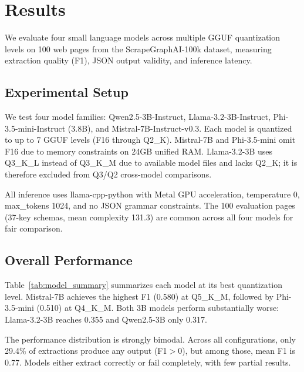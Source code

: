 
\section{Results}
\label{sec:results}

We evaluate four small language models across multiple GGUF quantization levels on 100 web pages from the ScrapeGraphAI-100k dataset, measuring extraction quality (F1), JSON output validity, and inference latency.

\subsection{Experimental Setup}

We test four model families: Qwen2.5-3B-Instruct, Llama-3.2-3B-Instruct, Phi-3.5-mini-Instruct (3.8B), and Mistral-7B-Instruct-v0.3. Each model is quantized to up to 7 GGUF levels (F16 through Q2\_K). Mistral-7B and Phi-3.5-mini omit F16 due to memory constraints on 24GB unified RAM. Llama-3.2-3B uses Q3\_K\_L instead of Q3\_K\_M due to available model files and lacks Q2\_K; it is therefore excluded from Q3/Q2 cross-model comparisons.

All inference uses llama-cpp-python with Metal GPU acceleration, temperature 0, max\_tokens 1024, and no JSON grammar constraints. The 100 evaluation pages (37-key schemas, mean complexity 131.3) are common across all four models for fair comparison.

\subsection{Overall Performance}



Table~\ref{tab:model_summary} summarizes each model at its best quantization level. Mistral-7B achieves the highest F1 (0.580) at Q5\_K\_M, followed by Phi-3.5-mini (0.510) at Q4\_K\_M. Both 3B models perform substantially worse: Llama-3.2-3B reaches 0.355 and Qwen2.5-3B only 0.317.

The performance distribution is strongly bimodal. Across all configurations, only 29.4\% of extractions produce any output (F1$>$0), but among those, mean F1 is 0.77. Models either extract correctly or fail completely, with few partial results.

